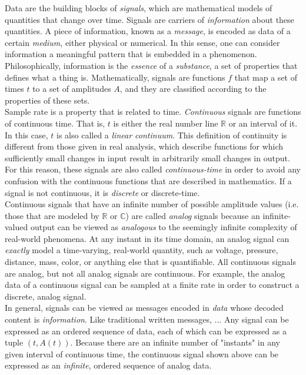 Data are the building blocks of \textit{signals}, which are mathematical models of quantities that change over time. Signals are carriers of \textit{information} about these quantities. A piece of information, known as a \textit{message}, is encoded as data of a certain \textit{medium}, either physical or numerical. In this sense, one can consider information a meaningful pattern that is embedded in a phenomenon. Philosophically, information is the \textit{essence} of a \textit{substance}, a set of properties that defines what a thing is. Mathematically, signals are functions $f$ that map a set of times $t$ to a set of amplitudes $A$, and they are classified according to the properties of these sets. \\

Sample rate is a property that is related to time. \textit{Continuous} signals are functions of continuous time. That is, $t$ is either the real number line $\mathbb{R}$ or an interval of it. In this case, $t$ is also called a \textit{linear continuum}. This definition of continuity is different from those given in real analysis, which describe functions for which sufficiently small changes in input result in arbitrarily small changes in output. For this reason, these signals are also called \textit{continuous-time} in order to avoid any confusion with the continuous functions that are described in mathematics. If a signal is not continuous, it is \textit{discrete} or discrete-time. \\

Continuous signals that have an infinite number of possible amplitude values (i.e. those that are modeled by $\mathbb{R}$ or $\mathbb{C}$) are called \textit{analog} signals because an infinite-valued output can be viewed as \textit{analogous} to the seemingly infinite complexity of real-world phenomena. At any instant in its time domain, an analog signal can \textit{exactly} model a time-varying, real-world quantity, such as voltage, pressure, distance, mass, color, or anything else that is quantifiable. All continuous signals are analog, but not all analog signals are continuous. For example, the analog data of a continuous signal can be sampled at a finite rate in order to construct a discrete, analog signal. \\


In general, signals can be viewed as messages encoded in \textit{data} whose decoded content is \textit{information}. Like traditional written messages, ... Any signal can be expressed as an ordered sequence of data, each of which can be expressed as a tuple $(t,A(t))$. Because there are an infinite number of "instants" in any given interval of continuous time, the continuous signal shown above can be expressed as an \textit{infinite}, ordered sequence of analog data. \\

